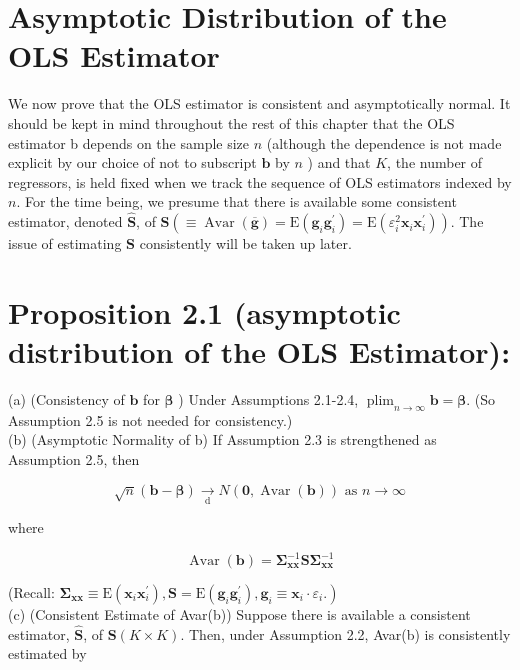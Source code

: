 \documentclass[10pt]{article}
\begin{document}
\section*{Asymptotic Distribution of the OLS Estimator}
We now prove that the OLS estimator is consistent and asymptotically normal. It should be kept in mind throughout the rest of this chapter that the OLS estimator b depends on the sample size $n$ (although the dependence is not made explicit by our choice of not to subscript $\mathbf{b}$ by $n$ ) and that $K$, the number of regressors, is held fixed when we track the sequence of OLS estimators indexed by $n$. For the time being, we presume that there is available some consistent estimator, denoted $\widehat{\mathbf{S}}$, of $\mathbf{S}\left(\equiv \operatorname{Avar}(\overline{\mathbf{g}})=\mathrm{E}\left(\mathbf{g}_{i} \mathbf{g}_{i}^{\prime}\right)=\mathrm{E}\left(\varepsilon_{i}^{2} \mathbf{x}_{i} \mathbf{x}_{i}^{\prime}\right)\right)$. The issue of estimating $\mathbf{S}$ consistently will be taken up later.

\section*{Proposition 2.1 (asymptotic distribution of the OLS Estimator):}
(a) (Consistency of $\mathbf{b}$ for $\boldsymbol{\beta}$ ) Under Assumptions 2.1-2.4, $\operatorname{plim}_{n \rightarrow \infty} \mathbf{b}=\boldsymbol{\beta}$. (So Assumption 2.5 is not needed for consistency.)\\
(b) (Asymptotic Normality of b) If Assumption 2.3 is strengthened as Assumption 2.5, then

$$
\sqrt{n}(\mathbf{b}-\boldsymbol{\beta}) \underset{\mathrm{d}}{\rightarrow} N(\mathbf{0}, \operatorname{Avar}(\mathbf{b})) \text { as } n \rightarrow \infty
$$

where


\begin{equation*}
\operatorname{Avar}(\mathbf{b})=\boldsymbol{\Sigma}_{\mathbf{x x}}^{-1} \mathbf{S} \boldsymbol{\Sigma}_{\mathbf{x x}}^{-1} \tag{2.3.4}
\end{equation*}


(Recall: $\left.\mathbf{\Sigma}_{\mathbf{x x}} \equiv \mathrm{E}\left(\mathbf{x}_{i} \mathbf{x}_{i}^{\prime}\right), \mathbf{S}=\mathrm{E}\left(\mathbf{g}_{i} \mathbf{g}_{i}^{\prime}\right), \mathbf{g}_{i} \equiv \mathbf{x}_{i} \cdot \varepsilon_{i}.\right)$\\
(c) (Consistent Estimate of Avar(b)) Suppose there is available a consistent estimator, $\widehat{\mathbf{S}}$, of $\mathbf{S}(K \times K)$. Then, under Assumption 2.2, Avar(b) is consistently estimated by
\end{document}
